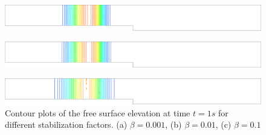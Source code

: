 \documentclass[a4paper,12pt]{article}
\begin{document}
\begin{figure}[H]
\begin{subfigure}{.05\textwidth}
    \caption{}
\end{subfigure}
\begin{minipage}[c]{.94\textwidth}
    \includegraphics[width=\textwidth]{img/step/stab_0.001_time_1.pdf}        
\end{minipage}
\par\medskip
\begin{subfigure}{.05\textwidth}
    \caption{}
\end{subfigure}
\begin{minipage}[c]{.94\textwidth}
    \includegraphics[width=\textwidth]{img/step/stab_0.01_time_1.pdf}        
\end{minipage}
\par\medskip
\begin{subfigure}{.05\textwidth}
    \caption{}
\end{subfigure}
\begin{minipage}[c]{.94\textwidth}
    \includegraphics[width=\textwidth]{img/step/stab_0.1_time_1.pdf}        
\end{minipage}
\caption{Contour plots of the free surface elevation at time $t=1s$ for different stabilization factors. (a) $\beta=0.001$, (b) $\beta=0.01$, (c) $\beta=0.1$}
\label{stab_parameters_time1}
\end{figure}
\end{document}
